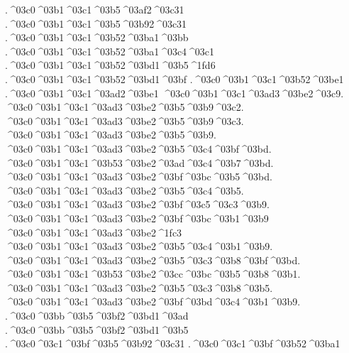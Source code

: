 {.^^^^03c0^^^^03b1^^^^03c1^^^^03b5^^^^03af2^^^^03c31 		%
.^^^^03c0^^^^03b1^^^^03c1^^^^03b5^^^^03b92^^^^03c31
.^^^^03c0^^^^03b1^^^^03c1^^^^03b52^^^^03ba1^^^^03bb 		%
.^^^^03c0^^^^03b1^^^^03c1^^^^03b52^^^^03ba1^^^^03c4^^^^03c1 		%
.^^^^03c0^^^^03b1^^^^03c1^^^^03b52^^^^03bd1^^^^03b5^^^^1fd6 		%
.^^^^03c0^^^^03b1^^^^03c1^^^^03b52^^^^03bd1^^^^03bf 		%
.^^^^03c0^^^^03b1^^^^03c1^^^^03b52^^^^03be1
.^^^^03c0^^^^03b1^^^^03c1^^^^03ad2^^^^03be1
	^^^^03c0^^^^03b1^^^^03c1^^^^03ad3^^^^03be2^^^^03c9.		%
	^^^^03c0^^^^03b1^^^^03c1^^^^03ad3^^^^03be2^^^^03b5^^^^03b9^^^^03c2.
	^^^^03c0^^^^03b1^^^^03c1^^^^03ad3^^^^03be2^^^^03b5^^^^03b9^^^^03c3.
	^^^^03c0^^^^03b1^^^^03c1^^^^03ad3^^^^03be2^^^^03b5^^^^03b9.
	^^^^03c0^^^^03b1^^^^03c1^^^^03ad3^^^^03be2^^^^03b5^^^^03c4^^^^03bf^^^^03bd.
	^^^^03c0^^^^03b1^^^^03c1^^^^03b53^^^^03be2^^^^03ad^^^^03c4^^^^03b7^^^^03bd.
	^^^^03c0^^^^03b1^^^^03c1^^^^03ad3^^^^03be2^^^^03bf^^^^03bc^^^^03b5^^^^03bd.
	^^^^03c0^^^^03b1^^^^03c1^^^^03ad3^^^^03be2^^^^03b5^^^^03c4^^^^03b5.
	^^^^03c0^^^^03b1^^^^03c1^^^^03ad3^^^^03be2^^^^03bf^^^^03c5^^^^03c3^^^^03b9.
	^^^^03c0^^^^03b1^^^^03c1^^^^03ad3^^^^03be2^^^^03bf^^^^03bc^^^^03b1^^^^03b9
	^^^^03c0^^^^03b1^^^^03c1^^^^03ad3^^^^03be2^^^^1fc3
	^^^^03c0^^^^03b1^^^^03c1^^^^03ad3^^^^03be2^^^^03b5^^^^03c4^^^^03b1^^^^03b9.
	^^^^03c0^^^^03b1^^^^03c1^^^^03ad3^^^^03be2^^^^03b5^^^^03c3^^^^03b8^^^^03bf^^^^03bd.
	^^^^03c0^^^^03b1^^^^03c1^^^^03b53^^^^03be2^^^^03cc^^^^03bc^^^^03b5^^^^03b8^^^^03b1.
	^^^^03c0^^^^03b1^^^^03c1^^^^03ad3^^^^03be2^^^^03b5^^^^03c3^^^^03b8^^^^03b5.
	^^^^03c0^^^^03b1^^^^03c1^^^^03ad3^^^^03be2^^^^03bf^^^^03bd^^^^03c4^^^^03b1^^^^03b9.
.^^^^03c0^^^^03bb^^^^03b5^^^^03bf2^^^^03bd1^^^^03ad 		%
.^^^^03c0^^^^03bb^^^^03b5^^^^03bf2^^^^03bd1^^^^03b5
.^^^^03c0^^^^03c1^^^^03bf^^^^03b5^^^^03b92^^^^03c31 		%
.^^^^03c0^^^^03c1^^^^03bf^^^^03b52^^^^03ba1 		%
}
